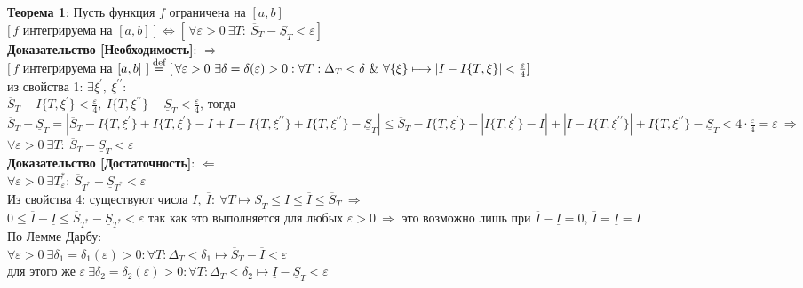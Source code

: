 \documentclass[a4paper,12pt]{article} %
\begin{document}
\noindent \textbf{Теорема 1}: Пусть функция $f$ ограничена на $[a,b]$\\
$[\,f$ интегрируема на $[a,b]~]\, \Leftrightarrow [\,\forall\varepsilon>0~\exists T:~\overline{S}_T-\underline{S}_T<\varepsilon]\,$\\
\noindent \textbf{Доказательство [Необходимость]}: $\Rightarrow$\\
$[\,f$ интегрируема на $[a,b]~] \stackrel{\text{def}}{=}[\,\forall\varepsilon>0~\exists\delta=\delta(\varepsilon)>0: \forall T:\\\Delta_{T}<\delta~\&~ \forall\{\xi\} \longmapsto|I-I\{T, \xi\}|<\frac{\varepsilon}{4}]\,$\\
из свойства 1: $\exists \xi^{\prime},~\xi^{\prime\prime}$:\\
$ \overline{S}_T - I\{T,\xi^{\prime}\}<\frac{\varepsilon}{4},~I\{T,\xi^{\prime\prime}\}-\underline{S}_T<\frac{\varepsilon}{4}$, тогда\\
$\overline{S}_T-\underline{S}_T=|\overline{S}_T-I\{T,\xi^{\prime}\}+I\{T,\xi^{\prime}\}-I+I-I\{T,\xi^{\prime\prime}\}+I\{T,\xi^{\prime\prime}\}-\underline{S}_T|\leq \overline{S}_T-I\{T,\xi^{\prime}\}+|I\{T,\xi^{\prime}\}-I|+|I-I\{T,\xi^{\prime\prime}\}|+I\{T,\xi^{\prime\prime}\}-\underline{S}_T<4\cdot \frac{\varepsilon}{4}=\varepsilon~\Rightarrow$\\
$\forall\varepsilon>0~\exists T:~\overline{S}_T-\underline{S}_T<\varepsilon$\\
\noindent \textbf{Доказательство [Достаточность]}: $\Leftarrow$\\
$\forall\varepsilon>0~\exists T^{*}_{\varepsilon}:~\overline{S}_{T^{*}}-\underline{S}_{T^{*}}<\varepsilon$\\
Из свойства 4: существуют числа $\underline{I},~\overline{I}:~\forall T\longmapsto \underline{S}_{T}\leq \underline{I}\leq \overline{I}\leq \overline{S}_{T}~\Rightarrow$\\
$0\leq \overline{I}-\underline{I}\leq \overline{S}_{T^{*}}-\underline{S}_{T^{*}}<\varepsilon$ так как это выполняется для любых $\varepsilon>0~\Rightarrow$ это возможно лишь при $\overline{I}-\underline{I}=0$, $\overline{I}=\underline{I}=I$\\
По Лемме Дарбу:\\
$\forall\varepsilon>0~\exists\delta_1 = \delta_{1}(\varepsilon)>0: \forall T:\Delta_{T}<\delta_1 \longmapsto \overline{S}_T-\overline{I}<\varepsilon$\\
для этого же $\varepsilon~\exists\delta_2 = \delta_{2}(\varepsilon)>0: \forall T:\Delta_{T}<\delta_2 \longmapsto \underline{I}-\underline{S}_T<\varepsilon$\\
\end{document}
